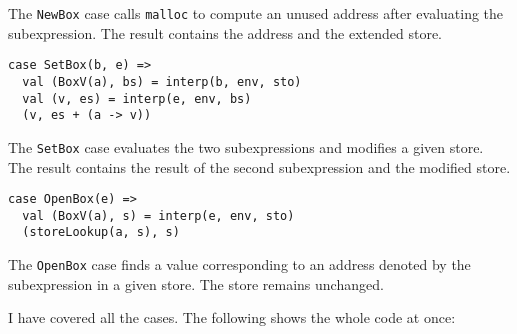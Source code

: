 The \verb!NewBox! case calls \verb!malloc! to compute an unused address after
evaluating the subexpression. The result contains the address and the extended
store.

\begin{verbatim}
case SetBox(b, e) =>
  val (BoxV(a), bs) = interp(b, env, sto)
  val (v, es) = interp(e, env, bs)
  (v, es + (a -> v))
\end{verbatim}

The \verb!SetBox! case evaluates the two subexpressions and modifies a given
store. The result contains the result of the second subexpression and the
modified store.

\begin{verbatim}
case OpenBox(e) =>
  val (BoxV(a), s) = interp(e, env, sto)
  (storeLookup(a, s), s)
\end{verbatim}

The \verb!OpenBox! case finds a value corresponding to an address denoted by the
subexpression in a given store. The store remains unchanged.

I have covered all the cases. The following shows the whole code at once:

